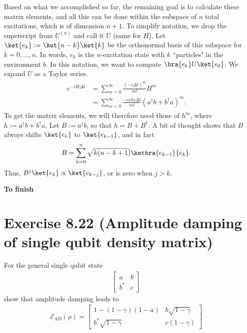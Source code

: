 \documentclass{book}
\begin{document}
    Based on what we accomplished so far, the remaining goal is to calculate these matrix elements, and all this can be done within the subspace of $n$ total excitations, which is of dimension $n+1$. To simplify notation, we drop the superscript from $U^{(n)}$ and call it $U$ (same for $H$). Let $\ket{e_k} := \ket{n-k}\ket{k}$ be the orthonormal basis of this subspace for $k = 0, \dots, n$. In words, $e_k$ is the $n$-excitation state with $k$ ``particles" in the environment $b$. In this notation, we want to compute $\bra{e_k} U \ket{e_0}$. We expand $U$ as a Taylor series.
    \begin{align}
    \begin{aligned}
        e^{-i H \Delta t} &= \sum_{m=0}^\infty \frac{(-i\Delta t)^m}{m!} H^m \\
        &= \sum_{m=0}^\infty \frac{-i chi\Delta t }{m!} (a^\dagger b + b^\dagger a)^m.
    \end{aligned}
    \end{align}
    To get the matrix elements, we will therefore need those of $h^m$, where $h := a^\dagger b + b^\dagger a$. Let $B := a^\dagger b$, so that $h = B + B^\dagger$. 
    A bit of thought shows that $B$ always shifts $\ket{e_k}$ to $\ket{e_{k-1}}$, and in fact
    \begin{align}
        B = \sum_{k=0}^n \sqrt{k(n-k+1)} \ketbra{e_{k-1}}{e_k}.
    \end{align}
    Thus, $B^j \ket{e_k} \propto \ket{e_{k-j}}$, or is zero when $j > k$.

    \textbf{To finish}
    

\section*{Exercise 8.22 (Amplitude damping of single qubit density matrix)}
    For the general single qubit state
    \begin{align}
        \begin{bmatrix}
            a & b \\
            b^* & c
        \end{bmatrix}
    \end{align}
    show that amplitude damping leads to 
    \begin{align}
        \mathcal{E}_\mathrm{AD}(\rho) = 
        \begin{bmatrix}
            1 - (1-\gamma)(1-a) & b \sqrt{1-\gamma} \\
            b^* \sqrt{1-\gamma} & c (1-\gamma)
        \end{bmatrix}
    \end{align}
\end{document}
